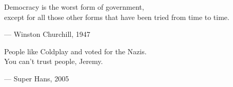 \begin{flushright}
\begin{hangleftquote}{\QENOpen}{\QENClose}
Democracy is the worst form of government,\\
except for all those other forms that have been tried from time to time.
\end{hangleftquote}
\par\smallskip
\normalfont — Winston Churchill, 1947
\end{flushright}
\vspace{2em}
\begin{flushright}
\begin{hangleftquote}{\QENOpen}{\QENClose}
People like Coldplay and voted for the Nazis.\\
You can't trust people, Jeremy.
\end{hangleftquote}
\par\smallskip
\normalfont — Super Hans, 2005
\end{flushright}
